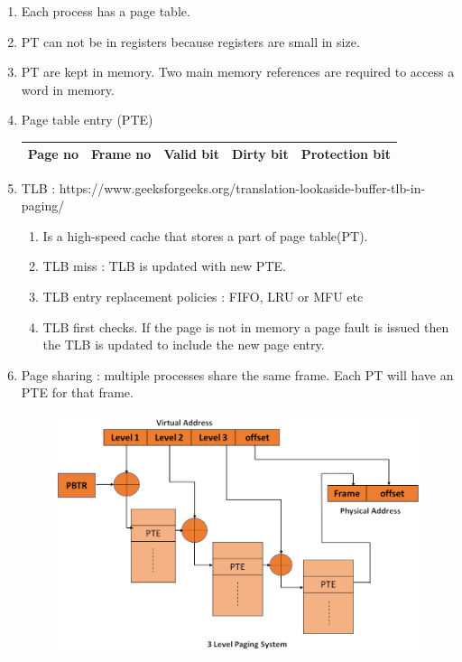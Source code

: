 \begin{enumerate}
  \item Each process has a page table.
  \item PT can not be in registers because registers are small in size.
  \item PT are kept in memory. Two main memory references are required to access a word in memory.
  \item Page table entry (PTE) \\
  \begin{myTableStyle}
    \begin{tabular}{ |m{2cm}|m{2cm}|m{2cm}|m{2cm}|m{3cm}| } \hline
        Page no &  Frame no & Valid bit & Dirty bit & Protection bit  \\ \hline
    \end{tabular}
  \end{myTableStyle}
  \vspace{0.08in}


  \item TLB : https://www.geeksforgeeks.org/translation-lookaside-buffer-tlb-in-paging/
    \begin{enumerate}
      \item Is a high-speed cache that stores a part of page table(PT).
      \item TLB miss : TLB is updated with new PTE.
      \item TLB entry replacement policies : FIFO, LRU or MFU etc
      \item TLB first checks. If the page is not in memory a page fault is issued then the TLB is updated to include the new page entry.
    \end{enumerate}
    \vspace{0.08in}

    \item Page sharing : multiple processes share the same  frame. Each PT will have an PTE for that frame.
    \vspace{0.08in}

      \begin{figure}[h]
          \centering   \includegraphics[scale=0.4]{./images/paging_03.jpeg}
      \end{figure}


\end{enumerate}
